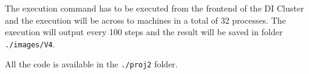 \documentclass[conference]{IEEEtran}
\begin{document}
The execution command has to be executed from the frontend of the DI Cluster and the execution will be across to machines in a total of 32 processes. The execution will output every 100 steps and the result will be saved in folder \texttt{./images/V4}.

All the code is available in the \texttt{./proj2} folder.
\end{document}

